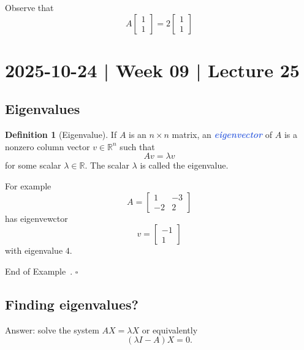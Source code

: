 \documentclass[10pt]{article}
\newcommand{\demph}[1]{\textcolor{RoyalBlue}{\textbf{\slshape #1}}} %
\theoremstyle{definition}
\newtheorem{definition}[theorem]{Definition}
\newtheorem{example}[theorem]{Example}
\renewenvironment{example}
{\begin{oldexample}}
  {\par\smallskip\hfill   End of Example~\theexample. $\square$    \par\end{oldexample}}
\newcommand{\R}{\mathbb{R}}           %
\begin{document}
Observe that
\begin{equation*}
  A
  \begin{bmatrix}
    1\\1
  \end{bmatrix}
  =2
  \begin{bmatrix}
    1\\1
  \end{bmatrix}
\end{equation*}

\newpage
\section{2025-10-24 | Week 09 | Lecture 25}


\subsection{Eigenvalues}


\begin{definition}[Eigenvalue]
  \label{def:eigenvalue}
  If $A$ is an $n\times n$ matrix, an \demph{eigenvector} of $A$ is a nonzero
  column vector $v\in \R^{n}$ such that
  \begin{equation*}
    Av=\lambda v
  \end{equation*}
  for some scalar $\lambda\in \R$. The scalar $\lambda$ is called the eigenvalue.
\end{definition}


\begin{example}
  For example
  \begin{equation*}
    A=
    \begin{bmatrix}
      1&-3\\
      -2&2
    \end{bmatrix}
  \end{equation*}
  has eigenvewctor
  \begin{equation*}
    v=
    \begin{bmatrix}
      -1\\1
    \end{bmatrix}
  \end{equation*}
  with eigenvalue $4$.
\end{example}


\subsection{Finding eigenvalues?}

Answer: solve the system
$AX =\lambda X$
or equivalently
\begin{equation*}
  (\lambda I-A)X=0.
\end{equation*}
\end{document}
